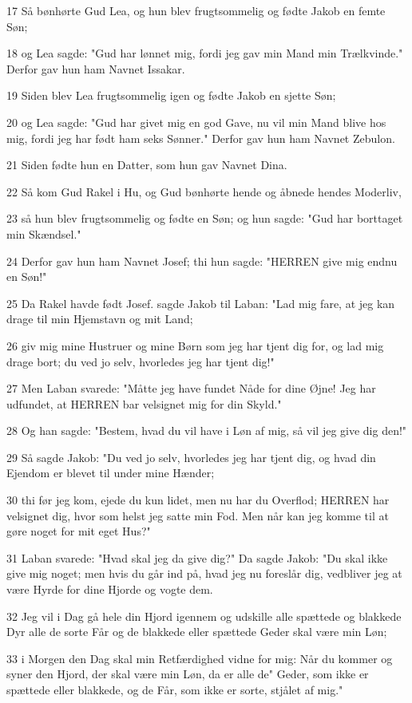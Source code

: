 \par 17 Så bønhørte Gud Lea, og hun blev frugtsommelig og fødte Jakob en femte Søn;
\par 18 og Lea sagde: "Gud har lønnet mig, fordi jeg gav min Mand min Trælkvinde." Derfor gav hun ham Navnet Issakar.
\par 19 Siden blev Lea frugtsommelig igen og fødte Jakob en sjette Søn;
\par 20 og Lea sagde: "Gud har givet mig en god Gave, nu vil min Mand blive hos mig, fordi jeg har født ham seks Sønner." Derfor gav hun ham Navnet Zebulon.
\par 21 Siden fødte hun en Datter, som hun gav Navnet Dina.
\par 22 Så kom Gud Rakel i Hu, og Gud bønhørte hende og åbnede hendes Moderliv,
\par 23 så hun blev frugtsommelig og fødte en Søn; og hun sagde: "Gud har borttaget min Skændsel."
\par 24 Derfor gav hun ham Navnet Josef; thi hun sagde: "HERREN give mig endnu en Søn!"
\par 25 Da Rakel havde født Josef. sagde Jakob til Laban: "Lad mig fare, at jeg kan drage til min Hjemstavn og mit Land;
\par 26 giv mig mine Hustruer og mine Børn som jeg har tjent dig for, og lad mig drage bort; du ved jo selv, hvorledes jeg har tjent dig!"
\par 27 Men Laban svarede: "Måtte jeg have fundet Nåde for dine Øjne! Jeg har udfundet, at HERREN bar velsignet mig for din Skyld."
\par 28 Og han sagde: "Bestem, hvad du vil have i Løn af mig, så vil jeg give dig den!"
\par 29 Så sagde Jakob: "Du ved jo selv, hvorledes jeg har tjent dig, og hvad din Ejendom er blevet til under mine Hænder;
\par 30 thi før jeg kom, ejede du kun lidet, men nu har du Overflod; HERREN har velsignet dig, hvor som helst jeg satte min Fod. Men når kan jeg komme til at gøre noget for mit eget Hus?"
\par 31 Laban svarede: "Hvad skal jeg da give dig?" Da sagde Jakob: "Du skal ikke give mig noget; men hvis du går ind på, hvad jeg nu foreslår dig, vedbliver jeg at være Hyrde for dine Hjorde og vogte dem.
\par 32 Jeg vil i Dag gå hele din Hjord igennem og udskille alle spættede og blakkede Dyr alle de sorte Får og de blakkede eller spættede Geder skal være min Løn;
\par 33 i Morgen den Dag skal min Retfærdighed vidne for mig: Når du kommer og syner den Hjord, der skal være min Løn, da er alle de" Geder, som ikke er spættede eller blakkede, og de Får, som ikke er sorte, stjålet af mig."
